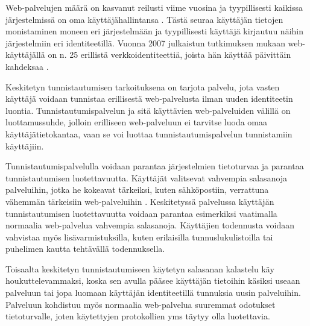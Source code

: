 Web-palvelujen määrä on kasvanut reilusti viime vuosina ja tyypillisesti kaikissa järjestelmissä on oma käyttäjähallintansa \cite{billion_keys}. Tästä seuraa käyttäjän tietojen monistaminen moneen eri järjestelmään ja tyypillisesti käyttäjä kirjautuu näihin järjestelmiin eri identiteetillä. Vuonna 2007 julkaistun tutkimuksen mukaan web-käyttäjällä on n. 25 erillistä verkkoidentiteettiä, joista hän käyttää päivittäin kahdeksaa \cite{password_habits}.

Keskitetyn tunnistautumisen tarkoituksena on tarjota palvelu, jota vasten käyttäjä voidaan tunnistaa erillisestä web-palvelusta ilman uuden identiteetin luontia. Tunnistautumispalvelun ja sitä käyttävien web-palveluiden välillä on luottamussuhde, jolloin erilliseen web-palveluun ei tarvitse luoda omaa käyttäjätietokantaa, vaan se voi luottaa tunnistautumispalvelun tunnistamiin käyttäjiin.

Tunnistautumispalvelulla voidaan parantaa järjestelmien tietoturvaa ja parantaa tunnistautumisen luotettavuutta. Käyttäjät valitsevat vahvempia salasanoja palveluihin, jotka he kokeavat tärkeiksi, kuten sähköpostiin, verrattuna vähemmän tärkeisiin web-palveluihin \cite{password_habits}. Keskitetyssä palvelussa käyttäjän tunnistautumisen luotettavuutta voidaan parantaa esimerkiksi vaatimalla normaalia web-palvelua vahvempia salasanoja. Käyttäjien todennusta voidaan vahvistaa myös lisävarmistuksilla, kuten erilaisilla tunnuslukulistoilla tai puhelimen kautta tehtävällä todennuksella.

Toisaalta keskitetyn tunnistautumiseen käytetyn salasanan kalastelu käy houkuttelevammaksi, koska sen avulla pääsee käyttäjän tietoihin käsiksi useaan palveluun tai jopa luomaan käyttäjän identiteetillä tunnuksia uusin palveluihin. Palveluun kohdistuu myös normaalia web-palvelua suuremmat odotukset tietoturvalle, joten käytettyjen protokollien yms täytyy olla luotettavia.

